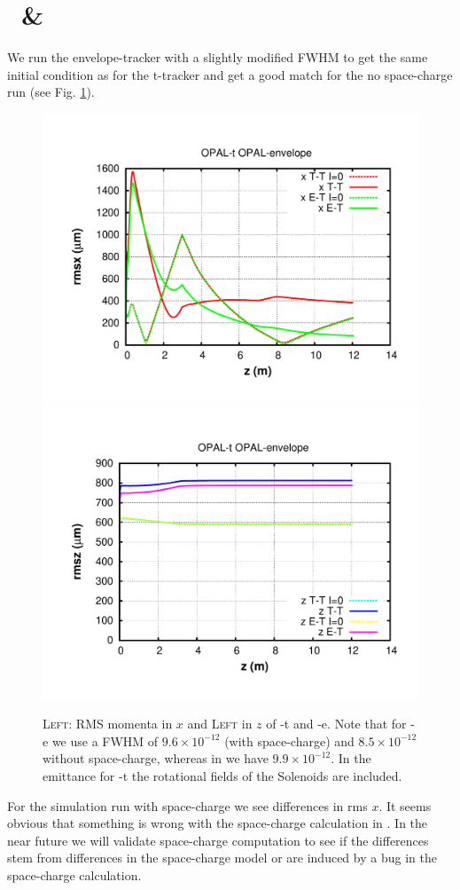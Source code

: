 \documentclass{psi-note}    %
\begin{document}
\clearpage
\section{\opalt\ \& \opale} \label{sec:tt-vs-et}
We run the envelope-tracker with a slightly modified FWHM to get the same
initial condition as for the t-tracker and get a good match for the no
space-charge run (see Fig. \ref{fig:tt_et_nosc}).
\begin{figure}[htbp]
\begin{center}
\includegraphics[width=.4\linewidth]{figures/et-tt-xrms}
\includegraphics[width=.4\linewidth]{figures/et-tt-zrms}
\caption{\textsc{Left}: RMS momenta in $x$ and \textsc{Left} in $z$
of \opal-t and \opal-e. Note that for \opal-e we use a FWHM of $9.6
\times 10^{-12}$ (with space-charge) and $8.5\times10^{-12}$ without
space-charge, whereas in \opalt we have $9.9\times 10^{-12}$. In the
emittance for \opal-t the rotational fields of the Solenoids are included.}
\label{fig:tt_et_nosc}
\end{center}
\end{figure}
For the simulation run with space-charge we see differences in rms $x$. It seems
obvious that something is wrong with the space-charge calculation in \opale. In
the near future we will validate space-charge computation to see if the
differences stem from differences in the space-charge model or are induced by a
bug in the space-charge calculation.
\end{document}
